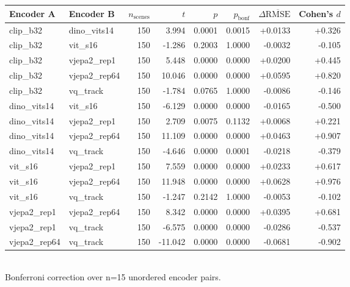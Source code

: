 \begin{tabular}{llrrrrrr}
\toprule
Encoder A & Encoder B & $n_{\text{scenes}}$ & $t$ & $p$ & $p_{\text{bonf}}$ & $\Delta\overline{\text{RMSE}}$ & Cohen's $d$ \\
\midrule
clip\_b32 & dino\_vits14 & 150 & 3.994 & 0.0001 & 0.0015 & +0.0133 & +0.326 \\
clip\_b32 & vit\_s16 & 150 & -1.286 & 0.2003 & 1.0000 & -0.0032 & -0.105 \\
clip\_b32 & vjepa2\_rep1 & 150 & 5.448 & 0.0000 & 0.0000 & +0.0200 & +0.445 \\
clip\_b32 & vjepa2\_rep64 & 150 & 10.046 & 0.0000 & 0.0000 & +0.0595 & +0.820 \\
clip\_b32 & vq\_track & 150 & -1.784 & 0.0765 & 1.0000 & -0.0086 & -0.146 \\
dino\_vits14 & vit\_s16 & 150 & -6.129 & 0.0000 & 0.0000 & -0.0165 & -0.500 \\
dino\_vits14 & vjepa2\_rep1 & 150 & 2.709 & 0.0075 & 0.1132 & +0.0068 & +0.221 \\
dino\_vits14 & vjepa2\_rep64 & 150 & 11.109 & 0.0000 & 0.0000 & +0.0463 & +0.907 \\
dino\_vits14 & vq\_track & 150 & -4.646 & 0.0000 & 0.0001 & -0.0218 & -0.379 \\
vit\_s16 & vjepa2\_rep1 & 150 & 7.559 & 0.0000 & 0.0000 & +0.0233 & +0.617 \\
vit\_s16 & vjepa2\_rep64 & 150 & 11.948 & 0.0000 & 0.0000 & +0.0628 & +0.976 \\
vit\_s16 & vq\_track & 150 & -1.247 & 0.2142 & 1.0000 & -0.0053 & -0.102 \\
vjepa2\_rep1 & vjepa2\_rep64 & 150 & 8.342 & 0.0000 & 0.0000 & +0.0395 & +0.681 \\
vjepa2\_rep1 & vq\_track & 150 & -6.575 & 0.0000 & 0.0000 & -0.0286 & -0.537 \\
vjepa2\_rep64 & vq\_track & 150 & -11.042 & 0.0000 & 0.0000 & -0.0681 & -0.902 \\
\bottomrule
\end{tabular}
\\[2pt] \footnotesize Bonferroni correction over n=15 unordered encoder pairs.
